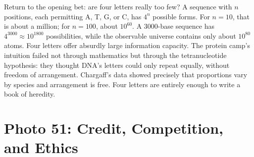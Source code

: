 \begin{qiaoliang}
Return to the opening bet: are four letters really too few? A sequence with $n$ positions, each permitting A, T, G, or C, has $4^n$ possible forms. For $n=10$, that is about a million; for $n=100$, about $10^{60}$. A 3000-base sequence has $4^{3000}\approx 10^{1800}$ possibilities, while the observable universe contains only about $10^{80}$ atoms. Four letters offer absurdly large information capacity. The protein camp's intuition failed not through mathematics but through the tetranucleotide hypothesis: they thought DNA's letters could only repeat equally, without freedom of arrangement. Chargaff's data showed precisely that proportions vary by species and arrangement is free. Four letters are entirely enough to write a book of heredity.
\end{qiaoliang}

\section{Photo 51: Credit, Competition, and Ethics}

